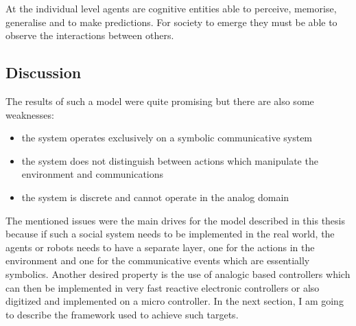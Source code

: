 At the individual level agents are cognitive entities able to perceive, memorise,
generalise and to make predictions.
For society to emerge they must be able to observe the interactions between others.

\subsection{Discussion}
The results of such a model were quite promising but there are also some weaknesses:
\begin{itemize}
 \item the system operates exclusively on a symbolic communicative system
 \item the system does not distinguish between actions which manipulate the environment 
and communications 
 \item the system is discrete and cannot operate in the analog domain
\end{itemize}

The mentioned issues were the main drives for the model described in this thesis because 
if such a social system needs to be implemented in the real world, the agents 
or robots needs to have a separate layer, one for the actions in the environment and one
 for the communicative events which are essentially symbolics.
Another desired property is the use of analogic based controllers which can 
then be implemented in very fast reactive electronic controllers or also 
digitized and implemented on a micro controller.
In the next section, I am going to describe the framework used to achieve such targets.



